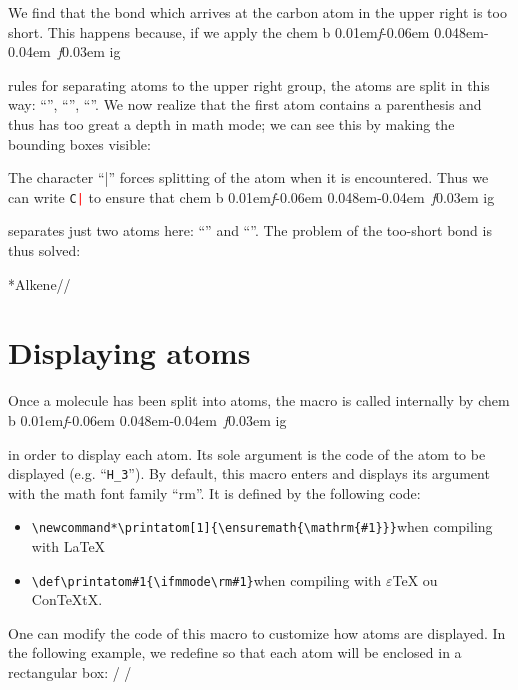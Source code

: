 \documentclass[10pt]{article}
\makeatletter
\newcommand\make@car@active[1]{%
	\catcode`#1\active
	\begingroup
		\lccode`\~`#1\relax
		\lowercase{\endgroup\def~}%
}
\newif\if@exstar
\newcommand\exemple{%
	\begingroup
	\parskip\z@
	\@makeother\;\@makeother\!\@makeother\?\@makeother\:%
	\@ifstar{\@exstartrue\exemple@}{\@exstarfalse\exemple@}}
\newcommand\exemple@[2][65]{%
	\medbreak\noindent
	\begingroup
		\let\do\@makeother\dospecials
		\make@car@active\ { {}}%
		\make@car@active\^^M{\par\leavevmode}%
		\make@car@active\^^I{\space\space}%
		\make@car@active\,{\leavevmode\kern\z@\string,}%
		\make@car@active\-{\leavevmode\kern\z@\string-}%
		\make@car@active\>{\leavevmode\kern\z@\string>}%
		\make@car@active\<{\leavevmode\kern\z@\string<}%
		\exemple@@{#1}{#2}%
}
\newcommand\exemple@@[3]{%
	\def\@tempa##1#3{\exemple@@@{#1}{#2}{##1}}%
	\@tempa
}
\newcommand\exemple@@@[3]{%
	\xdef\the@code{#3}%
	\endgroup
	\if@exstar
		\begingroup
			\fboxrule0.4pt
			\let\breakboxparindent\z@
			\def\bkvz@bottom{\hrule\@height\fboxrule}%
			\let\bkvz@before@breakbox\relax
			\def\bkvz@set@linewidth{\advance\linewidth\dimexpr-2\fboxrule-2\fboxsep}%
			\def\bkvz@left{\vrule\@width\fboxrule\hskip\fboxsep}%
			\def\bkvz@right{\hskip\fboxsep\vrule\@width\fboxrule}%
			\def\bkvz@top{\hbox to \hsize{%
				\vrule\@width\fboxrule\@height\fboxrule
				\leaders\bkvz@bottom\hfill
				\sffamily
				\fboxsep\z@
				\colorbox{black}{\kern0.25em\color{white}\footnotesize\lower0.5ex\hbox{\strut#2}\kern0.25em}%
				\leaders\bkvz@bottom\hfill
				\vrule\@width\fboxrule\@height\fboxrule}}%
			\breakbox
				\kern.5ex\relax
				\ttfamily\footnotesize\the@code\par
				\normalfont
				\kern3pt
				\hrule height0.1pt width\linewidth depth0.1pt
				\vskip5pt
				\rightskip0pt plus 1fill
				\everypar{{\color{lightgray}\rlap{\vrule height0.1pt width\linewidth depth0.1pt}}\hskip0pt plus 1fill}%
				\newlinechar`\^^M\everyeof{\noexpand}\scantokens{#3}\par
			\endbreakbox
		\endgroup
	\else
		\vskip0.5ex
		\boxput*(0,1)
			{\fboxsep\z@
			\hbox{\sffamily\colorbox{black}{\leavevmode\kern0.25em{\color{white}\footnotesize\strut#2}\kern0.25em}}%
			}%
			{\fboxsep5pt
			\fbox{%
				$\vcenter{\hsize\dimexpr0.#1\linewidth-\fboxsep-\fboxrule\relax
					\kern5pt\parskip0pt \ttfamily\footnotesize\the@code}%
				\vcenter{\kern5pt\hsize\dimexpr\linewidth-0.#1\linewidth-\fboxsep-\fboxrule\relax
					\everypar{{\color{lightgray}\rlap{\vrule height0.1pt width\dimexpr\linewidth-0.#1\linewidth-\fboxsep-\fboxrule depth0.1pt}}}%
					\footnotesize\newlinechar`\^^M\everyeof{\noexpand}\scantokens{#3}}$%
				}%
			}%
	\fi
	\medbreak
	\endgroup
}
\newcommand\falseverb[1]{{\ttfamily\detokenize\expandafter{\string#1}}}
\DeclareRobustCommand\CF{%
	\textsf{%
		chem%
		\if\string b\detokenize\expandafter{\f@series}%
			\lower0.01em\hbox{\itshape f}\kern-0.06em
		\else
			\lower0.048em\hbox{\kern-0.04em \itshape f}\kern0.03em
		\fi ig%
		}%
		\xspace
}
\makeatother
\begin{document}
We find that the bond which arrives at the carbon atom in the upper right is too short. This happens because, if we apply the \CF rules for separating atoms to the upper right group, the atoms are split in this way: ``\texttt{}'', ``\texttt{}'', ``\texttt{}''. We now realize that the first atom contains a parenthesis and thus has too great a depth in math mode; we can see this by making the bounding boxes visible:
\begin{center}
\fboxsep=0pt
\renewcommand*\printatom[1]{\fbox{\ensuremath{\mathrm{#1}}}}%
%
\end{center}
The character ``|'' forces splitting of the atom when it is encountered. Thus we can write \texttt{C\textcolor{red}{|}} to ensure that \CF separates just two atoms here: ``\texttt{}'' and ``\texttt{}''. The problem of the too-short bond is thus solved:

\exemple*{Alkene}//

\section{Displaying atoms}\label{perso.affichage}
Once a molecule has been split into atoms, the macro \falseverb{\printatom} is called internally by \CF in order to display each atom. Its sole argument is the code of the atom to be displayed (e.g. ``\verb-H_3-''). By default, this macro enters \falseverb{math mode} and displays its argument with the math font family ``rm''. It is defined by the following code:
\begin{itemize}
	\item \verb|\newcommand*\printatom[1]{\ensuremath{\mathrm{#1}}}|\qquad when compiling with \LaTeX{}
	\item \verb|\def\printatom#1{\ifmmode\rm#1\else$\rm#1$\fi}|\qquad when compiling with $\varepsilon$\TeX{} ou Con\TeX tX.
\end{itemize}

One can modify the code of this macro to customize how atoms are displayed. In the following example, we redefine \falseverb{\printatom} so that each atom will be enclosed in a rectangular box:
\exemple{Redefinition of \string\printatom}/\fboxsep=1pt
\renewcommand*\printatom[1]{\fbox{\ensuremath{\mathrm{#1}}}}
/
\end{document}
